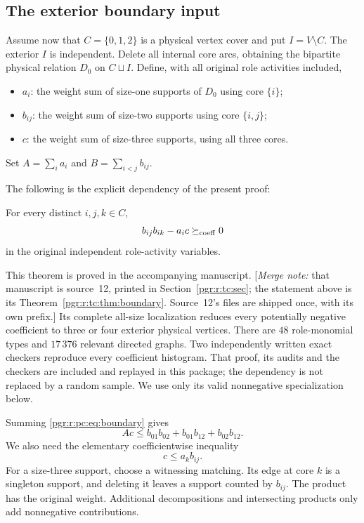 \documentclass[11pt]{article}
\numberwithin{equation}{section}
\theoremstyle{definition}\newtheorem{definition}[theorem]{Definition}\newtheorem{remark}[theorem]{Remark}
\newcommand{\mnote}[1]{[\textit{Merge note:} #1]}
\begin{document}
\subsection{The exterior boundary input}
Assume now that $C=\{0,1,2\}$ is a physical vertex cover and put
$I=V\setminus C$. The exterior $I$ is independent. Delete all internal core
arcs, obtaining the bipartite physical relation $D_0$ on $C\sqcup I$.
Define, with all original role activities included,
\begin{itemize}[nosep]
\item $a_i$: the weight sum of size-one supports of $D_0$ using core $\{i\}$;
\item $b_{ij}$: the weight sum of size-two supports using core $\{i,j\}$;
\item $c$: the weight sum of size-three supports, using all three cores.
\end{itemize}
Set $A=\sum_i a_i$ and $B=\sum_{i<j}b_{ij}$.

The following is the explicit dependency of the present proof:
\begin{lemma}\label{pgr:r:pc:lem:boundary}
For every distinct $i,j,k\in C$,
\begin{equation}\label{pgr:r:pc:eq:boundary}
 b_{ij}b_{ik}-a_ic\succeq_{\rm coeff}0
\end{equation}
in the original independent role-activity variables.
\end{lemma}
This theorem is proved in the accompanying manuscript. \mnote{that manuscript is source~12, printed in
Section~\ref{pgr:r:tc:sec}; the statement above is its
Theorem~\ref{pgr:r:tc:thm:boundary}. Source~12's files are shipped once,
with its own prefix.}
Its complete all-size localization reduces every potentially negative
coefficient to three or four exterior physical vertices. There are $48$
role-monomial types and $17\,376$ relevant directed graphs. Two independently
written exact checkers reproduce every coefficient histogram. That proof,
its audits and the checkers are included and replayed in this package; the
dependency is not replaced by a random sample. We use only its valid
nonnegative specialization below.

Summing \eqref{pgr:r:pc:eq:boundary} gives
\begin{equation}\label{pgr:r:pc:eq:Ac}
 Ac\le b_{01}b_{02}+b_{01}b_{12}+b_{02}b_{12}.
\end{equation}
We also need the elementary coefficientwise inequality
\begin{equation}\label{pgr:r:pc:eq:remove}
 c\le a_kb_{ij}.
\end{equation}
For a size-three support, choose a witnessing matching. Its edge at core $k$
is a singleton support, and deleting it leaves a support counted by $b_{ij}$.
The product has the original weight. Additional decompositions and intersecting
products only add nonnegative contributions.
\end{document}
